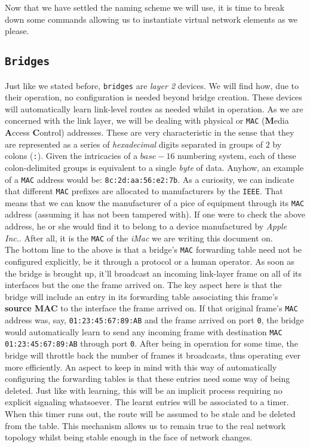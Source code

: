         Now that we have settled the naming scheme we will use, it is time to break down some commands allowing us to instantiate virtual network elements as we please.\\

        \subsection{\texttt{Bridges}}
            Just like we stated before, \texttt{bridges} are \textit{layer 2} devices. We will find how, due to their operation, no configuration is needed beyond bridge creation. These devices will automatically learn link-level routes as needed whilst in operation. As we are concerned with the link layer, we will be dealing with physical or \texttt{MAC} (\textbf{M}edia \textbf{A}ccess \textbf{C}ontrol) addresses. These are very characteristic in the sense that they are represented as a series of \textit{hexadecimal} digits separated in groups of $2$ by colons (\texttt{:}). Given the intricacies of a $base-16$ numbering system, each of these colon-delimited groups is equivalent to a single \textit{byte} of data. Anyhow, an example of a \texttt{MAC} address would be: \texttt{8c:2d:aa:56:e2:7b}. As a curiosity, we can indicate that different \texttt{MAC} prefixes are allocated to manufacturers by the \texttt{IEEE}. That means that we can know the manufacturer of a pice of equipment through its \texttt{MAC} address (assuming it has not been tampered with). If one were to check the above address, he or she would find it to belong to a device manufactured by \textit{Apple Inc.}. After all, it is the \texttt{MAC} of the \textit{iMac} we are writing this document on.\\

            The bottom line to the above is that a bridge's \texttt{MAC} forwarding table need not be configured explicitly, be it through a protocol or a human operator. As soon as the bridge is brought up, it'll broadcast an incoming link-layer frame on all of its interfaces but the one the frame arrived on. The key aspect here is that the bridge will include an entry in its forwarding table associating this frame's \textbf{source MAC} to the interface the frame arrived on. If that original frame's \texttt{MAC} address was, say, \texttt{01:23:45:67:89:AB} and the frame arrived on port \texttt{0}, the bridge would automatically learn to send any incoming frame with destination \texttt{MAC 01:23:45:67:89:AB} through port \texttt{0}. After being in operation for some time, the bridge will throttle back the number of frames it broadcasts, thus operating ever more efficiently. An aspect to keep in mind with this way of automatically configuring the forwarding tables is that these entries need some way of being deleted. Just like with learning, this will be an implicit process requiring no explicit signaling whatsoever. The learnt entries will be associated to a timer. When this timer runs out, the route will be assumed to be stale and be deleted from the table. This mechanism allows us to remain true to the real network topology whilst being stable enough in the face of network changes.\\


